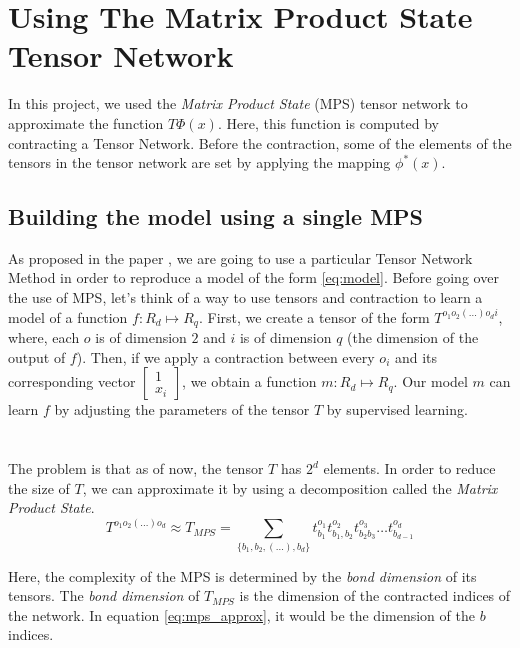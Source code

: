 \documentclass{article}
\theoremstyle{definition}
\theoremstyle{definition}
\begin{document}
\section{Using The Matrix Product State Tensor Network}

In this project, we used the {\it Matrix Product State} (MPS) tensor network to 
approximate the function $T  \Phi(x)$. Here, this function is computed by contracting 
a Tensor Network. Before the contraction, some of the elements of the tensors in the 
tensor network are set by applying the mapping $\phi^*(x)$.

\subsection{Building the model using a single MPS}
As proposed in the paper \cite{stoudenmire2017supervised}, we are going to use 
a particular Tensor Network Method in order to reproduce a model of the form \ref{eq:model}.
Before going over the use of MPS, let's think of a way to use tensors and contraction to 
learn a model of a function $f: R_d \mapsto R_q$. First, we create a tensor of the form $T^{o_1 o_2 (\dots) o_d i}$, 
where, each $o$ is of dimension $2$ and $i$ is of dimension $q$ (the dimension of the output of $f$). Then, if we apply a contraction 
between every $o_i$ and its corresponding vector $\begin{bmatrix}1 \\x_i\end{bmatrix}$, we obtain
a function $m: R_d \mapsto R_q$. Our model $m$ can learn $f$ by adjusting the parameters of the tensor 
$T$ by supervised learning.

\paragraph{} ${}$ \\
The problem is that as of now, the tensor $T$ has $2^{d}$ elements. In order to 
reduce the size of $T$, we can approximate it by using a decomposition called 
the \emph{Matrix Product State}.
\begin{equation} \label{eq:mps_approx}
T^{o_1 o_2 (\dots) o_d} \approx T_{MPS} = 
\sum_{ \{ b_1,b_2,(\dots), b_d \}} t^{o_1}_{b_1} t^{o_2}_{b_1, b_2} t^{o_3}_{b_2 b_3} \dots  t^{o_d}_{ b_{d-1} } 
\end{equation}

Here, the complexity of the MPS is determined by the \emph{bond dimension} of its tensors.
The \emph{bond dimension} of $T_{MPS}$ is the dimension of the contracted indices of the network.
In equation \ref{eq:mps_approx}, it would be the dimension of the $b$ indices.
\end{document}
